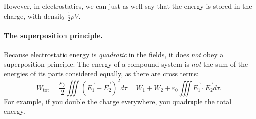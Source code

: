 However, in electrostatics, we can just as well say that the energy is stored in the charge, with density $\frac{1}{2}\rho V$.

\paragraph{The superposition principle.} Because electrostatic energy is \textit{quadratic} in the fields, it does \textit{not} obey a superposition principle. The energy of a compound system is \textit{not} the sum of the energies of its parts considered equally, as there are cross terms:
\[W_{\text{tot}}=\frac{\varepsilon_0}2\iiint (\vec{E_1}+\vec{E_2})^2d\tau=W_1+W_2+\varepsilon_0\iiint \vec{E_1}\cdot\vec{E_2}d\tau.\]
For example, if you double the charge everywhere, you quadruple the total energy.


